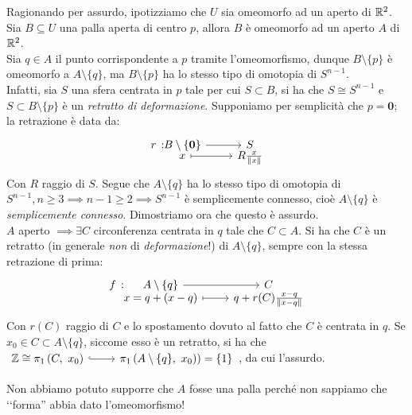 \begin{demonstration}
	Ragionando per assurdo, ipotizziamo che $U$ sia omeomorfo ad un aperto di $\mathbb{R}^2$. Sia $B\subseteq U$ una palla aperta di centro $p$, allora $B$ è omeomorfo ad un aperto $A$ di $\mathbb{R}^2$.\\
	Sia $q\in A$ il punto corrispondente a $p$ tramite l'omeomorfismo, dunque $B\setminus\{p\}$ è omeomorfo a $A\setminus\{q\}$, ma $B\setminus\{p\}$ ha lo stesso tipo di omotopia di $S^{n-1}$.\\ Infatti, sia $S$ una sfera centrata in $p$ tale per cui $S\subset B$, si ha che $S\cong S^{n-1}$ e $S\subset B\setminus\{p\}$ è un \textit{retratto di deformazione}. Supponiamo per semplicità che $p=\mathbf{0}$; la retrazione è data da:
	\begin{equation*}
		\funztot r {B\setminus \{\mathbf{0}\}} S x {R\frac{x}{\| x \|}}
	\end{equation*}
	Con $R$ raggio di $S$. Segue che $A\setminus \{q\}$ ha lo stesso tipo di omotopia di $S^{n-1}, n\geq 3\implies n-1\geq 2\implies S^{n-1}$ è semplicemente connesso, cioè $A\setminus\{q\}$ è \textit{semplicemente connesso}. Dimostriamo ora che questo è assurdo.\\
	$A$ aperto $\implies \exists C$ circonferenza centrata in $q$ tale che $C\subset A$. Si ha che $C$ è un retratto (in generale \textit{non} di \textit{deformazione}!) di $A\setminus\{q\}$, sempre con la stessa retrazione di prima:
	\begin{equation*}
		\funztot f {A\setminus\{q\}} C {x=q+(x-q)} {q+r(C)\frac{x-q}{\| x-q \|}}
	\end{equation*}
	Con $r(C)$ raggio di $C$ e lo spostamento dovuto al fatto che $C$ è centrata in $q$. Se $x_0\in C\subset A\setminus\{q\}$, siccome esso è un retratto,  si ha che $\incl{\ }{\integerset\cong \gruf{C}{x_0}}{\gruf{A\setminus\{q\}}{x_0} )=\left\{1\right\}}$, da cui l'assurdo.
\end{demonstration}
\begin{attention}
	Non abbiamo potuto supporre che $A$ fosse una palla perché non sappiamo che ‘‘forma'' abbia dato l'omeomorfismo!
\end{attention}

